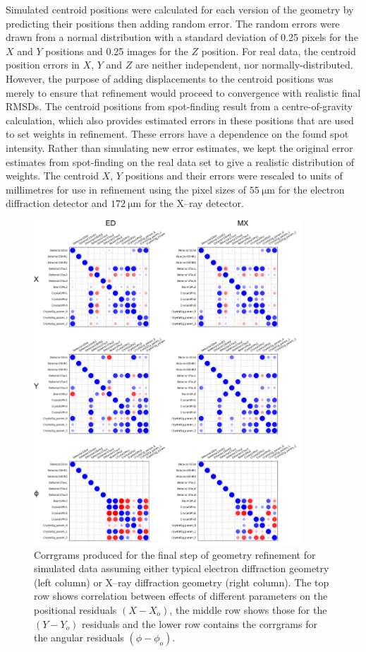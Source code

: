 \documentclass{article}
\begin{document}
Simulated centroid positions were calculated for each version of the geometry
by predicting their positions then adding random error. The random errors were
drawn from a normal distribution with a standard deviation of 0.25 pixels for
the $X$ and $Y$ positions and 0.25 images for the $Z$ position. For real data,
the centroid position errors in $X$, $Y$ and $Z$ are neither independent, nor
normally-distributed. However, the purpose of adding displacements to the
centroid positions was merely to ensure that refinement would proceed to
convergence with realistic final RMSDs. The centroid positions from
spot-finding result from a centre-of-gravity calculation, which also provides
estimated errors in these positions that are used to set weights in
refinement. These errors have a dependence on the found spot intensity. Rather
than simulating new error estimates, we kept the original error
estimates from spot-finding on the real data set to give a realistic
distribution of weights. The centroid $X$, $Y$ positions and their errors were
rescaled to units of millimetres for use in refinement using the pixel sizes
of $\SI{55}{\micro\metre}$ for the electron diffraction detector and
$\SI{172}{\micro\metre}$ for the X--ray detector.

\begin{figure}
  \label{fig:corrgrams-all}
  \centering
  \caption{
    Corrgrams produced for the final step of geometry refinement for simulated
    data assuming either typical electron diffraction geometry (left column)
    or X--ray diffraction geometry (right column). The top row shows
    correlation between effects of different parameters on the positional
    residuals $(X - X_o)$, the middle row shows those for the
    $(Y - Y_o)$ residuals and the lower row contains the corrgrams for the
    angular residuals $(\phi - \phi_o)$.
  }
  \includegraphics[width=0.9\textwidth]{Figures/simulation/corrgrams_all.png}
\end{figure}
\end{document}
